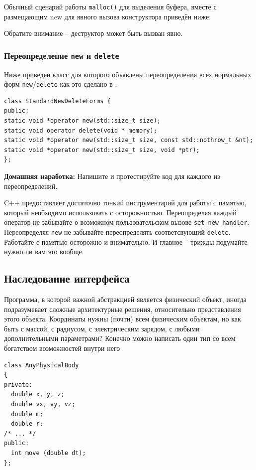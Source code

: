 \documentclass[a4paper,12pt,oneside]{article}
\begin{document}
Обычный сценарий работы \lstinline!malloc()! для выделения буфера, вместе с размещающим new для явного вызова конструктора приведён ниже:



Обратите внимание -- деструктор может быть вызван явно.

\subsubsection{Переопределение \lstinline!new! и \lstinline!delete!}

Ниже приведен класс для которого объявлены переопределения всех нормальных форм \lstinline!new!/\lstinline!delete! как это сделано в \cite{effcpp3d}.

\begin{lstlisting}
class StandardNewDeleteForms {
public:
static void *operator new(std::size_t size);
static void operator delete(void * memory);
static void *operator new(std::size_t size, const std::nothrow_t &nt);
static void *operator new(std::size_t size, void *ptr);
};
\end{lstlisting}

\textbf{Домашняя наработка:} 
Напишите и протестируйте код для каждого из переопределений.

C++ предоставляет достаточно тонкий инструментарий для работы с памятью, который необходимо использовать с осторожностью. Переопределяя каждый оператор не забывайте о возможном пользовательском вызове \lstinline!set_new_handler!. Переопределяя \lstinline!new! не забывайте переопределять соответсвующий \lstinline!delete!. Работайте с памятью осторожно и внимательно. И главное -- трижды подумайте нужно ли вам это вообще.

\subsection{Наследование интерфейса}

Программа, в которой важной абстракцией является физический объект, иногда подразумевает сложные архитектурные решения, относительно представления этого объекта. Координаты нужны (почти) всем физическим объектам, но как быть с массой, с радиусом, с электрическим зарядом, с любыми дополнительными параметрами? Конечно можно написать один тип со всем богатством возможностей внутри него

\begin{lstlisting}
class AnyPhysicalBody
{
private:
  double x, y, z;
  double vx, vy, vz;
  double m;
  double r;
/* ... */
public:
  int move (double dt);
};
\end{lstlisting}
\end{document}
